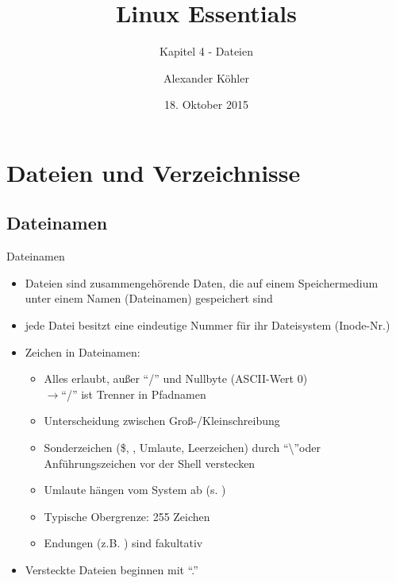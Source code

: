\documentclass[aspectratio=43]{beamer}
\title[Linux Essentials  - Kapitel 4 - Dateien]{Linux Essentials}
\subtitle{Kapitel 4 - Dateien}
\author{Alexander Köhler}
\date{18. Oktober 2015}
\begin{document}
\logoframe

\frame{\titlepage}

\setcounter{tocdepth}{1}
\section[Gliederung]{}
\frame{\tableofcontents}


\section{Dateien und Verzeichnisse}
\subsection{Dateinamen}
\begin{frame}{Dateinamen}
    \begin{itemize}
      \item Dateien sind zusammengehörende Daten, die auf einem Speichermedium unter einem
        Namen (Dateinamen) gespeichert sind
      \item jede Datei besitzt eine eindeutige Nummer für ihr Dateisystem (Inode-Nr.)
      \item Zeichen in Dateinamen:
      \begin{itemize}
        \item Alles erlaubt, außer "`/"' und Nullbyte (ASCII-Wert 0)\\
          $\rightarrow$"`/"' ist Trenner in Pfadnamen
        \item Unterscheidung zwischen Groß-/Kleinschreibung
        \item Sonderzeichen (\$, \textasteriskcentered, Umlaute, Leerzeichen) durch "`\textbackslash"'oder 
        Anführungszeichen vor der Shell verstecken
        \item Umlaute hängen vom System ab (s. )
        \item Typische Obergrenze: 255 Zeichen
      \item Endungen (z.B. ) sind fakultativ
      \end{itemize}
      \item Versteckte Dateien beginnen mit "`."'
    \end{itemize}
\end{frame}
\end{document}
